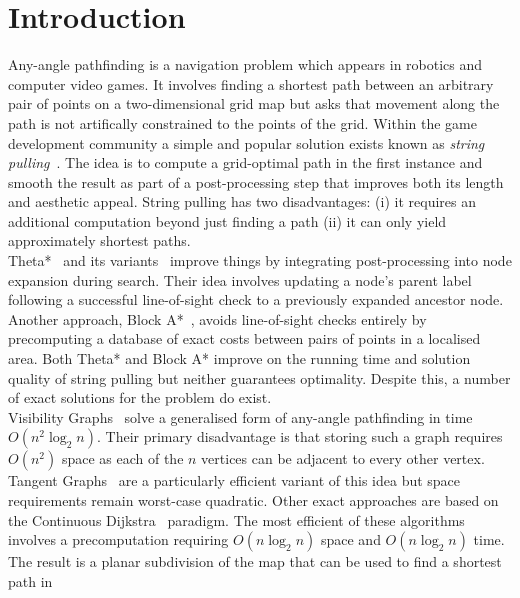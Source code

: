 \section{Introduction}
Any-angle pathfinding is a navigation problem which appears in robotics
and computer video games. It involves finding a shortest path between an 
arbitrary pair of points on a two-dimensional grid map but asks that 
movement along the path is not artifically constrained to the points of 
the grid.  Within the game development community a simple and popular 
solution exists known as \emph{string pulling}~\cite{pinter01,botea04}.
The idea is to compute a grid-optimal path in the first
instance and smooth the result as part of a post-processing step that improves
both its length and aesthetic appeal. String pulling has two disadvantages: 
(i) it requires an additional computation beyond just finding a path (ii)
it can only yield approximately shortest paths.
\\
Theta*~\cite{nash07} and its variants~\cite{nash09,nash10} improve things 
by integrating post-processing into node expansion during search. Their 
idea involves updating a node's parent label following a successful line-of-sight
check to a previously expanded ancestor node.
Another approach, Block A*~\cite{yap11}, avoids line-of-sight checks entirely 
by precomputing a database of exact costs between pairs of points in a localised area.
Both Theta* and Block A* improve on the running time and 
solution quality of string pulling but neither guarantees optimality.
Despite this, a number of exact solutions for the problem do exist.
\\
Visibility Graphs~\cite{lozanoperez79} solve a generalised form of 
any-angle pathfinding in time $O(n^2\log_{2}n)$. Their primary disadvantage
is that storing such a graph requires $O(n^2)$ space as each of the $n$ 
vertices can be adjacent to every other vertex.  
Tangent Graphs~\cite{liu92} are a particularly efficient 
variant of this idea but space requirements remain worst-case quadratic. 
Other exact approaches are based on the 
Continuous Dijkstra~\cite{mitchell87} paradigm.
The most efficient of these algorithms~\cite{hershberger99} involves a
precomputation requiring $O(n \log_{2}{n})$ space and $O(n\log_{2}n)$ time.  The result 
is a planar subdivision of the map that can be used to find a shortest path in 
